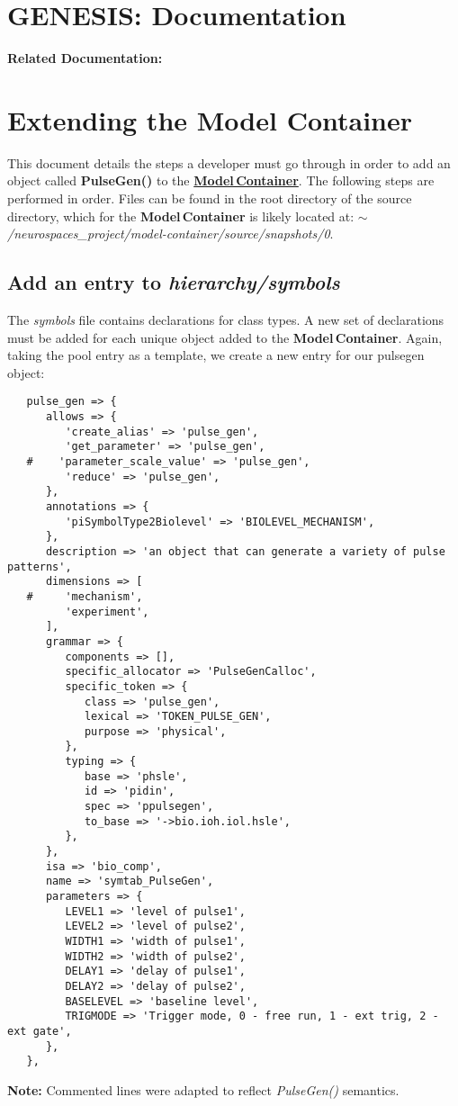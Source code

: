 \documentclass[12pt]{article}
\begin{document}
\section*{GENESIS: Documentation}

{\bf Related Documentation:}

\section*{Extending the Model Container}

This document details the steps a developer must go through in order to add an object called {\bf PulseGen()} to the \href{../model-container/model-container.tex}{\bf Model\,Container}. The following steps are performed in order. Files can be found in the root directory of the source directory, which for the {\bf Model\,Container} is likely located at: {\it $\sim$/neurospaces\_project/model-container/source/snapshots/0}.

\subsection*{Add an entry to {\it hierarchy/symbols}}

The {\it symbols} file contains declarations for class types. A new set of declarations must be added for each unique object added to the {\bf Model\,Container}. Again, taking the pool entry as a template, we create a new entry for our pulsegen object:
\begin{verbatim}
   pulse_gen => {
      allows => {
         'create_alias' => 'pulse_gen',
         'get_parameter' => 'pulse_gen',
   #    'parameter_scale_value' => 'pulse_gen',
         'reduce' => 'pulse_gen',
      },
      annotations => {
         'piSymbolType2Biolevel' => 'BIOLEVEL_MECHANISM',
      },
      description => 'an object that can generate a variety of pulse patterns',
      dimensions => [
   #     'mechanism',
         'experiment',
      ],
      grammar => {
         components => [],
         specific_allocator => 'PulseGenCalloc',
         specific_token => {
            class => 'pulse_gen',
            lexical => 'TOKEN_PULSE_GEN',
            purpose => 'physical',
         },
         typing => {
            base => 'phsle',
            id => 'pidin',
            spec => 'ppulsegen',
            to_base => '->bio.ioh.iol.hsle',
         },
      },
      isa => 'bio_comp',
      name => 'symtab_PulseGen',
      parameters => {
         LEVEL1 => 'level of pulse1',
         LEVEL2 => 'level of pulse2',
         WIDTH1 => 'width of pulse1',
         WIDTH2 => 'width of pulse2',
         DELAY1 => 'delay of pulse1',
         DELAY2 => 'delay of pulse2',
         BASELEVEL => 'baseline level',
         TRIGMODE => 'Trigger mode, 0 - free run, 1 - ext trig, 2 - ext gate',
      },
   },
\end{verbatim}        
{\bf Note:} Commented lines were adapted to reflect {\it PulseGen()} semantics.
\end{document}
